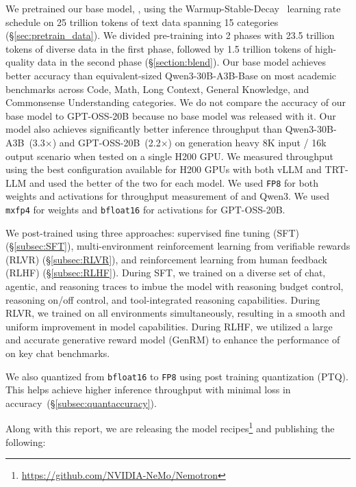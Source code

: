We pretrained our base model, \ourbasemodel, using the Warmup-Stable-Decay~\citep{hu2024minicpm} learning rate schedule on 25 trillion tokens of text data spanning 15 categories (\S\ref{sec:pretrain_data}). We divided pre-training into 2 phases with 23.5 trillion tokens of diverse data in the first phase, followed by 1.5 trillion tokens of high-quality data in the second phase (\S\ref{section:blend}). Our base model achieves better accuracy than equivalent-sized Qwen3-30B-A3B-Base on most academic benchmarks across Code, Math, Long Context, General Knowledge, and Commonsense Understanding categories. We do not compare the accuracy of our base model to GPT-OSS-20B because no base model was released with it.  Our model also achieves significantly better inference throughput than Qwen3-30B-A3B~(3.3$\times$) and GPT-OSS-20B~(2.2$\times$) on generation heavy 8K input / 16k output scenario when tested on a single H200 GPU. We measured throughput using the best configuration available for H200 GPUs with both vLLM and TRT-LLM and used the better of the two for each model. We used \texttt{FP8} for both weights and activations for throughput measurement of \ourmodel and Qwen3. We used \texttt{mxfp4} for weights and \texttt{bfloat16} for activations for GPT-OSS-20B.


We post-trained \ourmodel using three approaches: supervised fine tuning (SFT) (\S\ref{subsec:SFT}), multi-environment reinforcement learning from verifiable rewards (RLVR) (\S\ref{subsec:RLVR}), and reinforcement learning from human feedback (RLHF) (\S\ref{subsec:RLHF}). During SFT, we trained \ourmodel on a diverse set of chat, agentic, and reasoning traces to imbue the model with reasoning budget control, reasoning on/off control, and tool-integrated reasoning capabilities. During RLVR, we trained on all environments simultaneously, resulting in a smooth and uniform improvement in model capabilities. During RLHF, we utilized a large and accurate generative reward model (GenRM) to enhance the performance of \ourmodel on key chat benchmarks. %

We also quantized \ourmodel from \texttt{bfloat16} to \texttt{FP8} using post training quantization (PTQ). This helps achieve higher inference throughput with minimal loss in accuracy~(\S\ref{subsec:quantaccuracy}).

Along with this report, we are releasing the model recipes\footnote{\href{https://github.com/NVIDIA-NeMo/Nemotron}{https://github.com/NVIDIA-NeMo/Nemotron}} and publishing the following:

